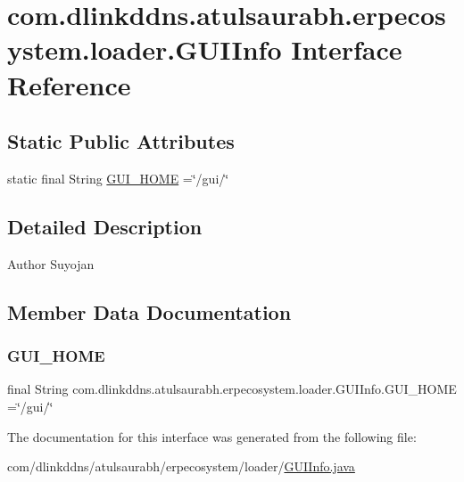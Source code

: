 \hypertarget{interfacecom_1_1dlinkddns_1_1atulsaurabh_1_1erpecosystem_1_1loader_1_1_g_u_i_info}{}\section{com.\+dlinkddns.\+atulsaurabh.\+erpecosystem.\+loader.\+G\+U\+I\+Info Interface Reference}
\label{interfacecom_1_1dlinkddns_1_1atulsaurabh_1_1erpecosystem_1_1loader_1_1_g_u_i_info}
\subsection*{Static Public Attributes}
\begin{DoxyCompactItemize}
\item 
static final String \mbox{\hyperlink{interfacecom_1_1dlinkddns_1_1atulsaurabh_1_1erpecosystem_1_1loader_1_1_g_u_i_info_a9357425e3de4062e155fe1fff7f920be}{G\+U\+I\+\_\+\+H\+O\+ME}} =\char`\"{}/gui/\char`\"{}
\end{DoxyCompactItemize}


\subsection{Detailed Description}
\begin{DoxyAuthor}{Author}
Suyojan 
\end{DoxyAuthor}


\subsection{Member Data Documentation}
\mbox{\label{interfacecom_1_1dlinkddns_1_1atulsaurabh_1_1erpecosystem_1_1loader_1_1_g_u_i_info_a9357425e3de4062e155fe1fff7f920be}} 
\subsubsection{\texorpdfstring{G\+U\+I\+\_\+\+H\+O\+ME}{GUI\_HOME}}
{\footnotesize\ttfamily final String com.\+dlinkddns.\+atulsaurabh.\+erpecosystem.\+loader.\+G\+U\+I\+Info.\+G\+U\+I\+\_\+\+H\+O\+ME =\char`\"{}/gui/\char`\"{}\hspace{0.3cm}{\ttfamily [static]}}



The documentation for this interface was generated from the following file\+:\begin{DoxyCompactItemize}
\item 
com/dlinkddns/atulsaurabh/erpecosystem/loader/\mbox{\hyperlink{_g_u_i_info_8java}{G\+U\+I\+Info.\+java}}\end{DoxyCompactItemize}
